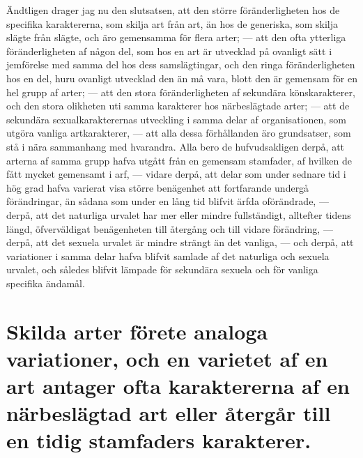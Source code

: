 Ändtligen drager jag nu den slutsatsen, att den större föränderligheten hos de specifika karaktererna, som skilja art från art, än hos de generiska, som skilja slägte från slägte, och äro gemensamma för flera arter; — att den ofta ytterliga föränderligheten af någon del, som hos en art är utvecklad på ovanligt sätt i jemförelse med samma del hos dess samslägtingar, och den ringa föränderligheten hos en del, huru ovanligt utvecklad den än må vara, blott den är gemensam för en hel grupp af arter; — att den stora föränderligheten af sekundära könskarakterer, och den stora olikheten uti samma karakterer hos närbeslägtade arter; — att de sekundära sexualkarakterernas utveckling i samma delar af organisationen, som utgöra vanliga artkarakterer, — att alla dessa förhållanden äro grundsatser, som stå i nära sammanhang med hvarandra. Alla bero de hufvudsakligen derpå, att arterna af samma grupp hafva utgått från en gemensam stamfader, af hvilken de fått mycket gemensamt i arf, — vidare derpå, att delar som under sednare tid i hög grad hafva varierat visa större benägenhet att fortfarande undergå förändringar, än sådana som under en lång tid blifvit ärfda oförändrade, — derpå, att det naturliga urvalet har mer eller mindre fullständigt, alltefter tidens längd, öfverväldigat benägenheten till återgång och till vidare förändring, — derpå, att det sexuela urvalet är mindre strängt än det vanliga, — och derpå, att variationer i samma delar hafva blifvit samlade af det naturliga och sexuela urvalet, och således blifvit lämpade för sekundära sexuela och för vanliga specifika ändamål.



\section[Variation hos skilda arter]{Skilda arter förete analoga variationer, och en varietet
af en art antager ofta karaktererna af en närbeslägtad
art eller återgår till en tidig stamfaders karakterer.}

